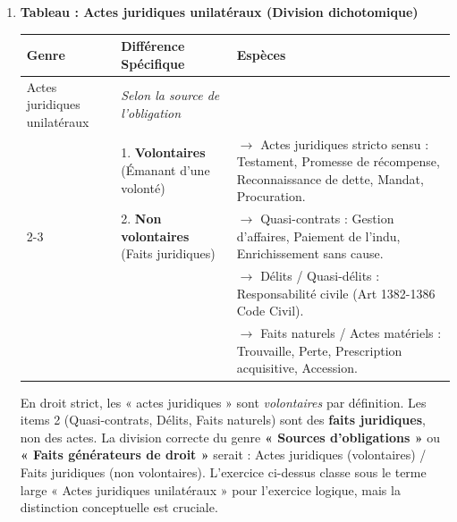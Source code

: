 \documentclass[11pt]{article}
\begin{document}
\begin{corrige}
\begin{enumerate}
    \item \textbf{Tableau : Actes juridiques unilatéraux (Division dichotomique)}
    \begin{center}
    \begin{tabular}{|l|l|l|}
    \hline
    \textbf{Genre} & \textbf{Différence Spécifique} & \textbf{Espèces} \\
    \hline
    Actes juridiques unilatéraux & \textit{Selon la source de l'obligation} & \\
    \hline
    & 1. \textbf{Volontaires} (Émanant d'une volonté) & $\rightarrow$ Actes juridiques stricto sensu : Testament, Promesse de récompense, Reconnaissance de dette, Mandat, Procuration. \\
    \cline{2-3}
    & 2. \textbf{Non volontaires} (Faits juridiques) & $\rightarrow$ Quasi-contrats : Gestion d'affaires, Paiement de l'indu, Enrichissement sans cause. \\
    & & $\rightarrow$ Délits / Quasi-délits : Responsabilité civile (Art 1382-1386 Code Civil). \\
    & & $\rightarrow$ Faits naturels / Actes matériels : Trouvaille, Perte, Prescription acquisitive, Accession. \\
    \hline
    \end{tabular}
    \end{center}
    \begin{attention}
    En droit strict, les « actes juridiques » sont \emph{volontaires} par définition. Les items 2 (Quasi-contrats, Délits, Faits naturels) sont des \textbf{faits juridiques}, non des actes. La division correcte du genre \textbf{« Sources d'obligations »} ou \textbf{« Faits générateurs de droit »} serait : Actes juridiques (volontaires) / Faits juridiques (non volontaires). L'exercice ci-dessus classe sous le terme large « Actes juridiques unilatéraux » pour l'exercice logique, mais la distinction conceptuelle est cruciale.
    \end{attention}


\end{enumerate}
\end{corrige}
\end{document}
